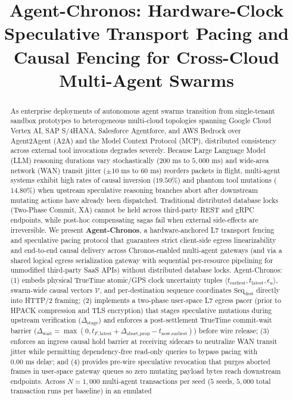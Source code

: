 \documentclass[conference,10pt]{IEEEtran}
\begin{document}
\title{Agent-Chronos: Hardware-Clock Speculative Transport Pacing and Causal Fencing for Cross-Cloud Multi-Agent Swarms}

\author{
}

\maketitle

\begin{abstract}
As enterprise deployments of autonomous agent swarms transition from single-tenant sandbox prototypes to heterogeneous multi-cloud topologies spanning Google Cloud Vertex AI, SAP S/4HANA, Salesforce Agentforce, and AWS Bedrock over Agent2Agent (A2A) and the Model Context Protocol (MCP), distributed consistency across external tool invocations degrades severely. Because Large Language Model (LLM) reasoning durations vary stochastically ($200\text{ ms}$ to $5{,}000\text{ ms}$) and wide-area network (WAN) transit jitter ($\pm 10\text{ ms}$ to $60\text{ ms}$) reorders packets in flight, multi-agent systems exhibit high rates of causal inversion ($19.50\%$) and phantom tool mutations ($14.80\%$) when upstream speculative reasoning branches abort after downstream mutating actions have already been dispatched. Traditional distributed database locks (Two-Phase Commit, XA) cannot be held across third-party REST and gRPC endpoints, while post-hoc compensating sagas fail when external side-effects are irreversible. We present \textbf{Agent-Chronos}, a hardware-anchored L7 transport fencing and speculative pacing protocol that guarantees strict client-side egress linearizability and end-to-end causal delivery across Chronos-enabled multi-agent gateways (and via a shared logical egress serialization gateway with sequential per-resource pipelining for unmodified third-party SaaS APIs) without distributed database locks. Agent-Chronos: (1) embeds physical TrueTime atomic/GPS clock uncertainty tuples $\langle t_{\text{earliest}}, t_{\text{latest}}, \epsilon_u \rangle$, swarm-wide causal vectors $\mathcal{V}$, and per-destination sequence coordinates $\text{Seq}_{\text{dest}}$ directly into HTTP/2 framing; (2) implements a two-phase user-space L7 egress pacer (prior to HPACK compression and TLS encryption) that stages speculative mutations during upstream verification ($\Delta_{\text{stage}}$) and enforces a post-settlement TrueTime commit-wait barrier ($\Delta_{\text{wait}} = \max(0, t_{F,\text{latest}} + \Delta_{\text{abort\_prop}} - t_{\text{now},\text{earliest}})$) before wire release; (3) enforces an ingress causal hold barrier at receiving sidecars to neutralize WAN transit jitter while permitting dependency-free read-only queries to bypass pacing with $0.00\text{ ms}$ delay; and (4) provides pre-wire speculative revocation that purges aborted frames in user-space gateway queues so zero mutating payload bytes reach downstream endpoints. Across $N = 1{,}000$ multi-agent transactions per seed ($5$ seeds, $5{,}000$ total transaction runs per baseline) in an emulated 
\end{abstract}
\end{document}
